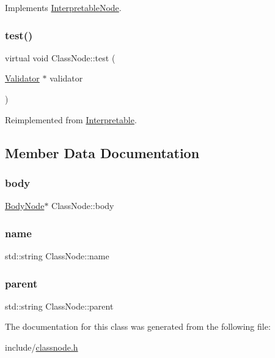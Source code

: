 Implements \hyperlink{classInterpretableNode_a9a466e7d65c4b323d2b96b4ac8396cd7}{Interpretable\+Node}.

\mbox{\label{classClassNode_ac5147024d81a0c6841e9453025e4f988}} 
\subsubsection{\texorpdfstring{test()}{test()}}
{\footnotesize\ttfamily virtual void Class\+Node\+::test (\begin{DoxyParamCaption}\item[{\hyperlink{classValidator}{Validator} $\ast$}]{validator }\end{DoxyParamCaption})\hspace{0.3cm}{\ttfamily [virtual]}}



Reimplemented from \hyperlink{classInterpretable_a32f547aaf68dcbab993284d3257ab010}{Interpretable}.



\subsection{Member Data Documentation}
\mbox{\label{classClassNode_ad5c089e050c2c7da583376fe16762689}} 
\subsubsection{\texorpdfstring{body}{body}}
{\footnotesize\ttfamily \hyperlink{classBodyNode}{Body\+Node}$\ast$ Class\+Node\+::body}

\mbox{\label{classClassNode_a1fc3152f6442b5f6913ec72f26afacbe}} 
\subsubsection{\texorpdfstring{name}{name}}
{\footnotesize\ttfamily std\+::string Class\+Node\+::name}

\mbox{\label{classClassNode_a844a82eec88057b0faaf203f5a60a301}} 
\subsubsection{\texorpdfstring{parent}{parent}}
{\footnotesize\ttfamily std\+::string Class\+Node\+::parent}



The documentation for this class was generated from the following file\+:\begin{DoxyCompactItemize}
\item 
include/\hyperlink{classnode_8h}{classnode.\+h}\end{DoxyCompactItemize}
